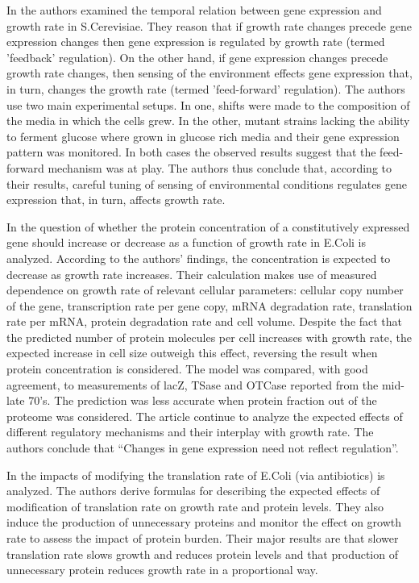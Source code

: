 \documentclass[a4page]{report}
\begin{document}
In \cite{Levy2009} the authors examined the temporal relation between gene expression and growth rate in S.Cerevisiae.
They reason that if growth rate changes precede gene expression changes then gene expression is regulated by growth rate (termed 'feedback' regulation).
On the other hand, if gene expression changes precede growth rate changes, then sensing of the environment effects gene expression that, in turn, changes the growth rate (termed 'feed-forward' regulation).
The authors use two main experimental setups.
In one, shifts were made to the composition of the media in which the cells grew.
In the other, mutant strains lacking the ability to ferment glucose where grown in glucose rich media and their gene expression pattern was monitored.
In both cases the observed results suggest that the feed-forward mechanism was at play.
The authors thus conclude that, according to their results, careful tuning of sensing of environmental conditions regulates gene expression that, in turn, affects growth rate.

In \cite{Klumpp2009a} the question of whether the protein concentration of a constitutively expressed gene should increase or decrease as a function of growth rate in E.Coli is analyzed.
According to the authors' findings, the concentration is expected to decrease as growth rate increases.
Their calculation makes use of measured dependence on growth rate of relevant cellular parameters: cellular copy number of the gene, transcription rate per gene copy, mRNA degradation rate, translation rate per mRNA, protein degradation rate and cell volume.
Despite the fact that the predicted number of protein molecules per cell increases with growth rate, the expected increase in cell size outweigh this effect, reversing the result when protein concentration is considered.
The model was compared, with good agreement, to measurements of lacZ, TSase and OTCase reported from the mid-late 70's.
The prediction was less accurate when protein fraction out of the proteome was considered.
The article continue to analyze the expected effects of different regulatory mechanisms and their interplay with growth rate.
The authors conclude that ``Changes in gene expression need not reflect regulation''.

In \cite{Scott2010b} the impacts of modifying the translation rate of E.Coli (via antibiotics) is analyzed.
The authors derive formulas for describing the expected effects of modification of translation rate on growth rate and protein levels.
They also induce the production of unnecessary proteins and monitor the effect on growth rate to assess the impact of protein burden.
Their major results are that slower translation rate slows growth and reduces protein levels and that production of unnecessary protein reduces growth rate in a proportional way.
\end{document}
